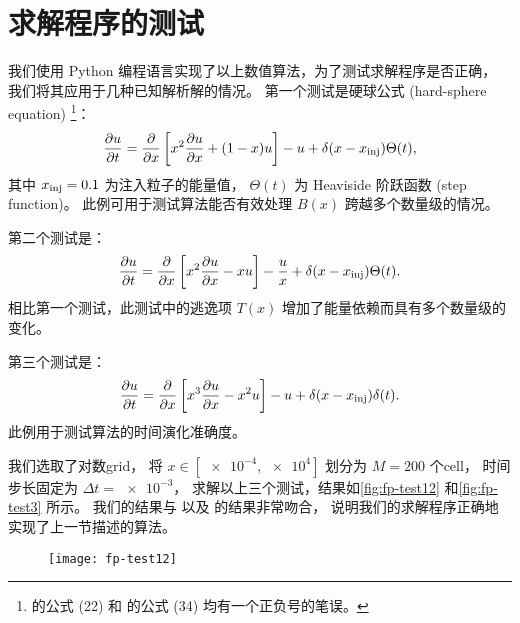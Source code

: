 \section{求解程序的测试}

我们使用 Python 编程语言实现了以上数值算法，为了测试求解程序是否正确，
我们将其应用于几种已知解析解的情况\cite{park1996,donnert2014}。
第一个测试是硬球公式 (hard-sphere equation) \footnote{%
   的公式 (22) 和  的公式 (34)
  均有一个正负号的笔误。
}：
\begin{equation}
  \label{eq:fp-test1}
  \frac{\partial u}{\partial t} = \frac{\partial }{\partial x} \left[ x^2 \frac{\partial u}{\partial x} + (1-x) u \right]
    - u + \delta(x-x_{\mathrm{inj}}) \Theta(t) ,
\end{equation}
其中 $x_{\mathrm{inj}} = 0.1$ 为注入粒子的能量值，
$\Theta(t)$ 为 Heaviside 阶跃函数 (step function)。
此例可用于测试算法能否有效处理 $B(x)$ 跨越多个数量级的情况。

第二个测试是：
\begin{equation}
  \label{eq:fp-test2}
  \frac{\partial u}{\partial t} = \frac{\partial }{\partial x} \left[ x^2 \frac{\partial u}{\partial x} - x u \right]
    - \frac{u}{x} + \delta(x-x_{\mathrm{inj}}) \Theta(t) .
\end{equation}
相比第一个测试，此测试中的逃逸项 $T(x)$ 增加了能量依赖而具有多个数量级的变化。

第三个测试是：
\begin{equation}
  \label{eq:fp-test3}
  \frac{\partial u}{\partial t} = \frac{\partial }{\partial x} \left[ x^3 \frac{\partial u}{\partial x} - x^2 u \right]
    - u + \delta(x-x_{\mathrm{inj}}) \delta(t) .
\end{equation}
此例用于测试算法的时间演化准确度。

我们选取了对数\ac{grid}，
将 $x \in [\num{e-4}, \num{e4}]$ 划分为 $M = 200$ 个\ac{cell}，
时间步长固定为 $\Delta t = \num{e-3}$，
求解以上三个测试，结果如\autoref{fig:fp-test12} 和\autoref{fig:fp-test3} 所示。
我们的结果与  以及  的结果非常吻合，
说明我们的求解程序正确地实现了上一节描述的算法。

\begin{figure}[htp]
  \centering
  \texttt{[image: fp-test12]}
  \label{fig:fp-test12}
\end{figure}

